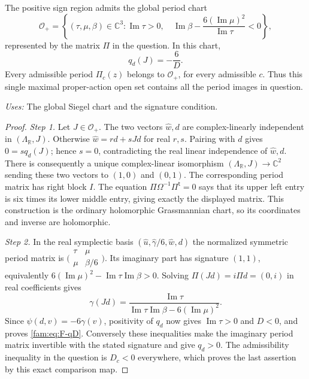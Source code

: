 \begin{proposition}[FAM F.2.3; T]\label{fam:F.2.3}
The positive sign region admits the global period chart
\[
 \mathcal O_+=\left\{
 (\tau,\mu,\beta)\in\mathbb C^3:
 \operatorname{Im}\tau>0,\quad
 \operatorname{Im}\beta-\frac{6(\operatorname{Im}\mu)^2}
 {\operatorname{Im}\tau}<0\right\},
\]
represented by the matrix $\Pi$ in the question.  In this chart,
\begin{equation}\label{fam:eq:F-qD}
 q_d(J)=-\frac6D.
\end{equation}
Every admissible period $\Pi_c(z)$ belongs to $\mathcal O_+$, for every
admissible $c$.  Thus this single maximal proper-action open set contains
all the period images in question.
\end{proposition}
\noindent\emph{Uses:} The global Siegel chart and the signature condition.\par

\begin{proof}
\par\noindent\textit{Step 1.} Let $J\in\mathcal O_+$.  The two vectors $\widehat w,d$ are complex-linearly
independent in $(\Lambda_{\mathbb R},J)$.  Otherwise
$\widehat w=r d+sJd$ for real $r,s$.  Pairing with $d$ gives
$0=sq_d(J)$; hence $s=0$, contradicting the real linear independence
of $\widehat w,d$.  There is consequently a unique complex-linear
isomorphism $(\Lambda_{\mathbb R},J)\to\mathbb C^2$ sending these two
vectors to $(1,0)$ and $(0,1)$.  The corresponding period matrix has
right block $I$.  The equation
$\Pi\Omega^{-1}\Pi^{\mathsf t}=0$ says that its upper left entry is
six times its lower middle entry, giving exactly the displayed matrix.
This construction is the ordinary holomorphic Grassmannian chart,
so its coordinates and inverse are holomorphic.

\par\noindent\textit{Step 2.} In the real symplectic basis
$(\widehat u,\widehat\gamma/6,\widehat w,d)$ the normalized symmetric
period matrix is
$\bigl(\begin{smallmatrix}\tau&\mu\\\mu&\beta/6\end{smallmatrix}\bigr)$.
Its imaginary part has signature $(1,1)$, equivalently
$6(\operatorname{Im}\mu)^2-
\operatorname{Im}\tau\operatorname{Im}\beta>0$.
Solving $\Pi(Jd)=i\Pi d=(0,i)$ in real coefficients gives
\[
 \gamma(Jd)=
 \frac{\operatorname{Im}\tau}
 {\operatorname{Im}\tau\operatorname{Im}\beta-
 6(\operatorname{Im}\mu)^2}.
\]
Since $\psi(d,v)=-6\gamma(v)$, positivity of $q_d$ now gives
$\operatorname{Im}\tau>0$ and $D<0$, and proves \eqref{fam:eq:F-qD}.
Conversely these inequalities make the imaginary period matrix
invertible with the stated signature and give $q_d>0$.  The admissibility
inequality in the question is $D_c<0$ everywhere, which proves the last
assertion by this exact comparison map.
\end{proof}

